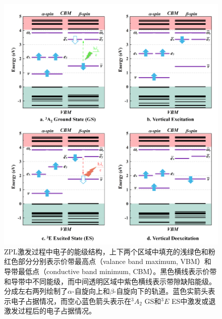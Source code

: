 \documentclass[type = bachelor]{whu-thesis}
\begin{document}
\begin{figure}
  \centering
  \includegraphics[width=1.0\textwidth]{figures/Chapter 3/Excitation Process.png}
  \caption[ZPL激发过程中电子的能级结构]{ZPL激发过程中电子的能级结构，上下两个区域中填充的浅绿色和粉红色部分分别表示价带最高点（valance band maximum, VBM）和导带最低点（conductive band minimum, CBM）。黑色横线表示价带和导带中不同能级，而中间透明区域中紫色横线表示带隙缺陷能级。分成左右两列绘制了$\alpha$-自旋向上和$\beta$-自旋向下的轨道。蓝色实箭头表示电子占据情况，而空心蓝色箭头表示在$^3A_2$ GS和$^3E$ ES中激发或退激发过程后的电子占据情况。}
  \label{fig: Excitation Process}
\end{figure}
\end{document}
